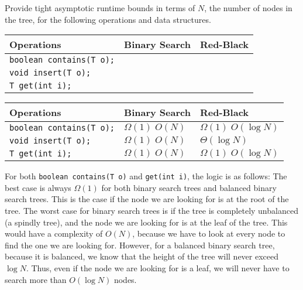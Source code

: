 \begin{blocksection}
\question Provide tight asymptotic runtime bounds in terms of $N$, the number
of nodes in the tree, for the following operations and data structures.

\ifprintanswers\else
{
\renewcommand{\arraystretch}{2}
\setlength{\tabcolsep}{16pt}
\begin{tabularx}{\textwidth}{Xp{1in}p{1in}}
Operations                         & Binary Search      & Red-Black      \\\hline
\lstinline$boolean contains(T o);$ &                    &                \\
\lstinline$void insert(T o);$      &                    &                \\
\lstinline$T get(int i);$          &                    &
\end{tabularx}
}
\fi

\begin{solution}
{
\renewcommand{\arraystretch}{2}
\setlength{\tabcolsep}{16pt}
\begin{tabularx}{\textwidth}{Xll}
Operations                         & Binary Search      & Red-Black               \\\hline
\lstinline$boolean contains(T o);$ & $\Omega(1)\; O(N)$ & $\Omega(1)\; O(\log N)$ \\
\lstinline$void insert(T o);$      & $\Omega(1)\; O(N)$ & $\Theta(\log N)$        \\
\lstinline$T get(int i);$          & $\Omega(1)\; O(N)$ & $\Omega(1)\; O(\log N)$
\end{tabularx}
}

For both \lstinline$boolean contains(T o)$ and \lstinline$get(int i)$, the logic is as follows:
The best case is always $\Omega(1)$ for both binary search trees and balanced binary search trees.  This is the case if the node we are looking for is at the root of the tree.  The worst case for binary search trees is if the tree is completely unbalanced (a spindly tree), and the node we are looking for is at the leaf of the tree.  This would have a complexity of $O(N)$, because we have to look at every node to find the one we are looking for.  However, for a balanced binary search tree, because it is balanced, we know that the height of the tree will never exceed $\log N$.  Thus, even if the node we are looking for is a leaf, we will never have to search more than $O(\log N)$ nodes.


\end{solution}
\end{blocksection}
